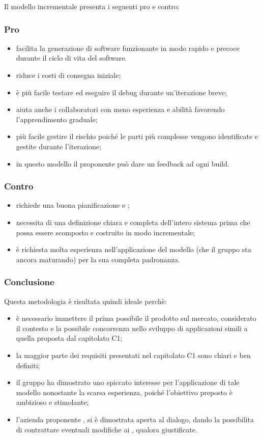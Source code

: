 Il modello incrementale presenta i seguenti pro e contro:\\
\subsubsection{\textbf{Pro}}
\begin{itemize}
    \item facilita la generazione di software funzionante in modo rapido e precoce durante il ciclo di vita del software.
    \item riduce i costi di consegna iniziale;
    \item è più facile testare ed eseguire il debug durante un'iterazione breve;
    \item aiuta anche i collaboratori con meno esperienza e abilità favorendo l'apprendimento graduale;
    \item più facile gestire il rischio poiché le parti più complesse vengono identificate e gestite durante l'iterazione;
    \item in questo modello il proponente può dare un feedback ad ogni build.
\end{itemize}

\subsubsection{\textbf{Contro}}
\begin{itemize}
    \item richiede una buona pianificazione e ;
    \item necessita di una definizione chiara e completa dell'intero sistema prima che possa essere scomposto e costruito in modo incrementale;
    \item è richiesta molta esperienza nell'applicazione del modello (che il gruppo sta ancora maturando) per la sua completa padronanza.
\end{itemize}

\subsubsection{\textbf{Conclusione}}
Questa metodologia è risultata quindi ideale perchè:
\begin{itemize}
    \item è necessario immettere il prima possibile il prodotto sul mercato, considerato il contesto e la possibile concorrenza nello sviluppo di applicazioni simili a quella proposta dal capitolato C1;
    \item la maggior parte dei requisiti presentati nel capitolato C1 sono chiari e ben definiti;
    \item il gruppo ha dimostrato uno spiccato interesse per l'applicazione di tale modello nonostante la scarsa esperienza, poiché l'obiettivo preposto è ambizioso e stimolante;
    \item l'azienda proponente \proponente{}, si è dimostrata aperta al dialogo, dando la possibilita di contrattare eventuali modifiche ai , qualora giustificate.
\end{itemize}
